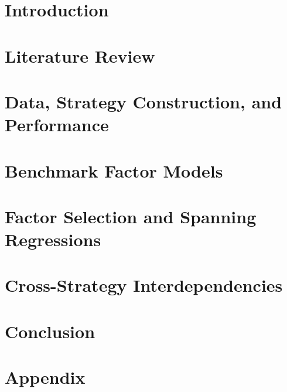 \documentclass[12pt, oneside, letterpaper]{article}
\begin{document}



\clearpage
\section{Introduction}
\label{sec:introduction}


\section{Literature Review}
\label{sec:literature}


\section{Data, Strategy Construction, and Performance}
\label{sec:data}


\section{Benchmark Factor Models}
\label{sec:benchmarks}


\section{Factor Selection and Spanning Regressions}
\label{sec:factor_selection}


\section{Cross-Strategy Interdependencies}
\label{sec:interdependencies}


\section{Conclusion}
\label{sec:conclusion}


\clearpage
\begin{singlespace}

\end{singlespace}

\clearpage
\appendix
\section{Appendix}
\label{sec:appendix}

\end{document}
